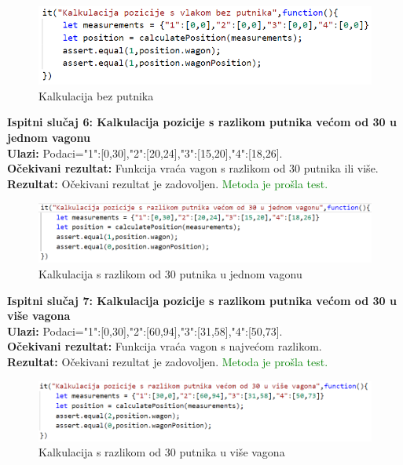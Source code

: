 {			%
				\begin{figure}[H]
					\centering
					\includegraphics[width=1\linewidth]{"slike/kalkulacijaBezPutnika.png"}
					\caption{Kalkulacija bez putnika}
					\label{fig:nul-kal}
				\end{figure}
		
			\noindent \textbf {Ispitni slučaj 6: Kalkulacija pozicije s razlikom putnika većom od 30 u jednom vagonu }\\
			\noindent \textbf {Ulazi:} Podaci={"1":[0,30],"2":[20,24],"3":[15,20],"4":[18,26]}.\\
			\noindent \textbf {Očekivani rezultat:} Funkcija vraća vagon s razlikom od 30 putnika ili više.\\
			\noindent \textbf {Rezultat:} Očekivani rezultat je zadovoljen. \textcolor{green}{Metoda je prošla test.}\\

				\begin{figure}[H]
					\centering
					\includegraphics[width=1\linewidth]{"slike/kalkulacijaSRazlikomOd30.png"}
					\caption{Kalkulacija s razlikom od 30 putnika u jednom vagonu}
					\label{fig:j-kal}
				\end{figure}

			\noindent \textbf {Ispitni slučaj 7: Kalkulacija pozicije s razlikom putnika većom od 30 u više vagona }\\
			\noindent \textbf {Ulazi:} Podaci={"1":[0,30],"2":[60,94],"3":[31,58],"4":[50,73]}.\\
			\noindent \textbf {Očekivani rezultat:} Funkcija vraća vagon s najvećom razlikom.\\
			\noindent \textbf {Rezultat:} Očekivani rezultat je zadovoljen. \textcolor{green}{Metoda je prošla test.}\\

				\begin{figure}[H]
					\centering
					\includegraphics[width=1\linewidth]{"slike/kalkulacijaSRazlikomOd30uVise.png"}
					\caption{Kalkulacija s razlikom od 30 putnika u više vagona}
					\label{fig:v-kal}
				\end{figure}
			
}
